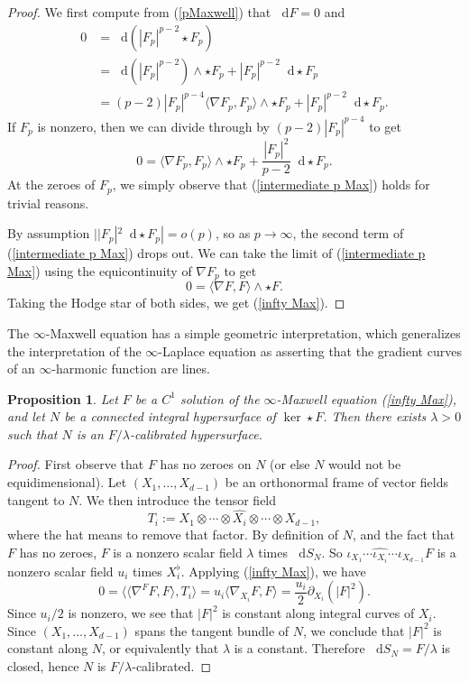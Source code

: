 \documentclass[reqno,11pt]{amsart}
\newcommand*\dif{\mathop{}\!\mathrm{d}}
\newtheorem{proposition}[theorem]{Proposition}
\theoremstyle{definition}
\numberwithin{equation}{section}
\begin{document}
\begin{proof}
We first compute from (\ref{pMaxwell}) that $\dif F = 0$ and
\begin{align*}
0
&= \dif(|F_p|^{p - 2} \star F_p) \\
&= \dif(|F_p|^{p - 2}) \wedge \star F_p + |F_p|^{p - 2} \dif \star F_p \\
&= (p - 2) |F_p|^{p - 4} \langle \nabla F_p, F_p\rangle \wedge \star F_p + |F_p|^{p - 2} \dif \star F_p.
\end{align*}
If $F_p$ is nonzero, then we can divide through by $(p - 2) |F_p|^{p - 4}$ to get
\begin{equation}\label{intermediate p Max}
0 = \langle\nabla F_p, F_p\rangle \wedge \star F_p + \frac{|F_p|^2}{p - 2} \dif \star F_p.
\end{equation}
At the zeroes of $F_p$, we simply observe that (\ref{intermediate p Max}) holds for trivial reasons.

By assumption $||F_p|^2 \dif \star F_p| = o(p)$, so as $p \to \infty$, the second term of (\ref{intermediate p Max}) drops out.
We can take the limit of (\ref{intermediate p Max}) using the equicontinuity of $\nabla F_p$ to get
$$0 = \langle \nabla F, F \rangle \wedge \star F.$$
Taking the Hodge star of both sides, we get (\ref{infty Max}).
\end{proof}

The $\infty$-Maxwell equation has a simple geometric interpretation, which generalizes the interpretation of the $\infty$-Laplace equation as asserting that the gradient curves of an $\infty$-harmonic function are lines.

\begin{proposition}
Let $F$ be a $C^1$ solution of the $\infty$-Maxwell equation (\ref{infty Max}), and let $N$ be a connected integral hypersurface of $\ker \star F$.
Then there exists $\lambda > 0$ such that $N$ is an $F/\lambda$-calibrated hypersurface.
\end{proposition}
\begin{proof}
First observe that $F$ has no zeroes on $N$ (or else $N$ would not be equidimensional).
Let $(X_1, \dots, X_{d - 1})$ be an orthonormal frame of vector fields tangent to $N$.
We then introduce the tensor field
$$T_i := X_1 \otimes \cdots \otimes \widehat{X_i} \otimes \cdots \otimes X_{d - 1},$$
where the hat means to remove that factor.
By definition of $N$, and the fact that $F$ has no zeroes, $F$ is a nonzero scalar field $\lambda$ times $\dif S_N$.
So $\iota_{X_1} \cdots \widehat{\iota_{X_i}} \cdots \iota_{X_{d - 1}} F$ is a nonzero scalar field $u_i$ times $X_i^\flat$.
Applying (\ref{infty Max}), we have 
$$0 = \langle \langle \nabla^F F, F\rangle, T_i\rangle = u_i \langle \nabla_{X_i} F, F \rangle = \frac{u_i}{2} \partial_{X_i} (|F|^2).$$
Since $u_i/2$ is nonzero, we see that $|F|^2$ is constant along integral curves of $X_i$.
Since $(X_1, \dots, X_{d - 1})$ spans the tangent bundle of $N$, we conclude that $|F|^2$ is constant along $N$, or equivalently that $\lambda$ is a constant.
Therefore $\dif S_N = F/\lambda$ is closed, hence $N$ is $F/\lambda$-calibrated.
\end{proof}
\end{document}
